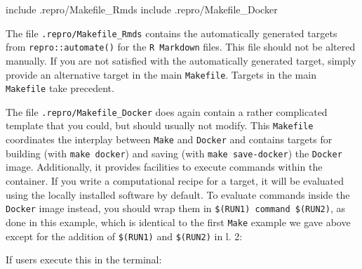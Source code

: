 \documentclass[psych,tutorial,accept,moreauthors,pdftex]{Definitions/mdpi}
\newenvironment{Shaded}{\begin{snugshade}}{\end{snugshade}}
\newcommand{\AttributeTok}[1]{\textcolor[rgb]{0.77,0.63,0.00}{#1}}
\newcommand{\ExtensionTok}[1]{#1}
\newcommand{\NormalTok}[1]{#1}
\newcommand{\StringTok}[1]{\textcolor[rgb]{0.31,0.60,0.02}{#1}}
\newcommand{\VariableTok}[1]{\textcolor[rgb]{0.00,0.00,0.00}{#1}}
\begin{document}
\begin{paracol}{2}
\begin{adjustwidth}{0.5cm}{0cm} 
\begin{Shaded}
\begin{Highlighting}[]
\ExtensionTok{include}\NormalTok{ .repro/Makefile\_Rmds}
\ExtensionTok{include}\NormalTok{ .repro/Makefile\_Docker}
\end{Highlighting}
\end{Shaded}
\end{adjustwidth}


The file \texttt{.repro/Makefile\_Rmds} contains the automatically
generated targets from \texttt{repro::automate()} for the
\texttt{R\ Markdown} files. This file should not be altered manually. If
you are not satisfied with the automatically generated target, simply
provide an alternative target in the main \texttt{Makefile}. Targets in
the main \texttt{Makefile} take precedent.

The file \texttt{.repro/Makefile\_Docker} does again contain a rather
complicated template that you could, but should usually not modify. This
\texttt{Makefile} coordinates the interplay between \texttt{Make} and
\texttt{Docker} and contains targets for building (with
\texttt{make\ docker}) and saving (with \texttt{make\ save-docker}) the
\texttt{Docker} image. Additionally, it provides facilities to execute
commands within the container. If you write a computational recipe for a
target, it will be evaluated using the locally installed software by
default. To evaluate commands inside the \texttt{Docker} image instead,
you should wrap them in \texttt{\$(RUN1)\ command\ \$(RUN2)}, as done in
this example, which is identical to the first \texttt{Make} example we
gave above except for the addition of \texttt{\$(RUN1)} and
\texttt{\$(RUN2)} in l. 2:

\begin{adjustwidth}{0.5cm}{0cm} 
\begin{Shaded}
\end{Shaded}
\end{adjustwidth}


If users execute this in the terminal:


\end{paracol}
\end{document}
